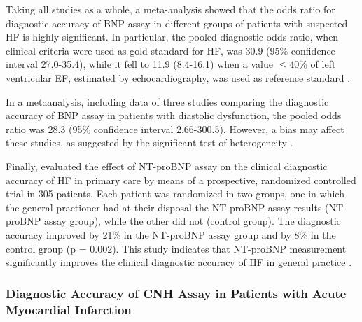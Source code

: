 \documentclass[14pt,a4paper,onecolumn]{extarticle}
\begin{document}
Taking all studies as a whole, a meta-analysis showed that the odds ratio for diagnostic accuracy of BNP assay in different groups of patients with suspected HF is highly significant. In particular, the pooled diagnostic odds ratio, when clinical criteria were used as gold standard for HF, was 30.9 (95\% confidence interval 27.0-35.4), while it fell to 11.9 (8.4-16.1) when a value $\leq$40\% of left ventricular EF, estimated by echocardiography, was used as reference standard \citep{bib372}.


In a metaanalysis, including data of three studies comparing the diagnostic accuracy of BNP assay in patients with diastolic dysfunction, the pooled odds ratio was 28.3 (95\% confidence interval 2.66-300.5). However, a bias may affect these studies, as suggested by the significant test of heterogeneity \citep{bib372}.

Finally, \citep{bib3133} evaluated the effect of NT-proBNP assay on the clinical diagnostic accuracy of HF in primary care by means of a prospective, randomized controlled trial in 305 patients. Each patient was randomized in two groups, one in which the general practioner had at their disposal the NT-proBNP assay results (NT-proBNP assay group), while the other did not (control group). The diagnostic accuracy improved by 21\% in the NT-proBNP assay group and by 8\% in the control group (p = 0.002). This study indicates that NT-proBNP measurement significantly improves the clinical diagnostic accuracy of HF in general practice \citep{bib3133}.

\subsubsection{ Diagnostic Accuracy of CNH Assay in Patients with Acute Myocardial Infarction}
\end{document}
